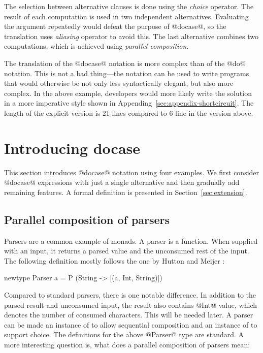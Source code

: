 \documentclass[preprint]{sigplanconf}
\begin{document}
The selection between alternative clauses is done using the \textit{choice} operator. The result 
of each computation is used in two independent alternatives. Evaluating the argument repeatedly 
would defeat the purpose of @docase@, so the translation uses \textit{aliasing} operator to avoid 
this. The last alternative combines two computations, which is achieved using \textit{parallel
composition}.

The translation of the @docase@ notation is more complex than of the @do@ notation. This is not
a bad thing---the notation can be used to write programs that would otherwise be not
only less syntactically elegant, but also more complex. In the above example, developers would
more likely write the solution in a more imperative style shown in Appending~\ref{sec:appendix-shortcircuit}.
The length of the explicit version is 21 lines compared to 6 line in the version above. 


\section{Introducing docase}
This section introduces @docase@ notation using four examples. We first consider @docase@
expressions with just a single alternative and then gradually add remaining features. A formal 
definition is presented in Section~\ref{sec:extension}.


\subsection{Parallel composition of parsers}
\label{sec:intro-combining-parsers}
Parsers are a common example of monads. A parser is a function. When supplied with an input, it 
returns a parsed value and the unconsumed rest of the input. The following definition mostly follows
the one by Hutton and Meijer \cite{parsingtutorial}:

\begin{code}
newtype Parser a = P (String -> [(a, Int, String)])
\end{code}
Compared to standard parsers, there is one notable difference. In addition to the parsed result
and unconsumed input, the result also contains @Int@ value, which denotes the number of consumed
characters. This will be needed later.
A parser can be made an instance of  to allow sequential composition and an instance 
of  to support choice. The definitions for the above @Parser@ type are standard. 
A more interesting question is, what does a parallel composition of parsers mean:
\end{document}
